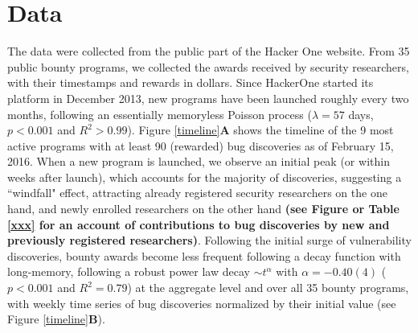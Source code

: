 \section{Data}
\label{sec:data}
The data were collected from the public part of the Hacker One website. From 35 public bounty programs, we collected the awards received by security researchers, with their timestamps and rewards in dollars. Since HackerOne started its platform in December 2013, new programs have been launched roughly every two months, following an essentially memoryless Poisson process ($\lambda = 57$ days, $p < 0.001$ and $R^2 > 0.99$). Figure \ref{timeline}{\bf A} shows the timeline of the 9 most active programs with at least 90 (rewarded) bug discoveries as of February 15, 2016. When a new program is launched, we observe an initial peak (or within weeks after launch), which accounts for the majority of discoveries, suggesting a ``windfall" effect, attracting already registered security researchers on the one hand, and newly enrolled researchers on the other hand {\bf (see Figure or Table \ref{xxx} for an account of contributions to bug discoveries by new and previously registered researchers)}. Following the initial surge of vulnerability discoveries, bounty awards become less frequent following a decay function with long-memory, following a robust power law decay $\sim t^{\alpha}$ with $\alpha = -0.40(4)$ ($p < 0.001$ and $R^2 = 0.79$) at the aggregate level and over all 35 bounty programs, with weekly time series of bug discoveries normalized by their initial value (see Figure \ref{timeline}{\bf B}).\\



